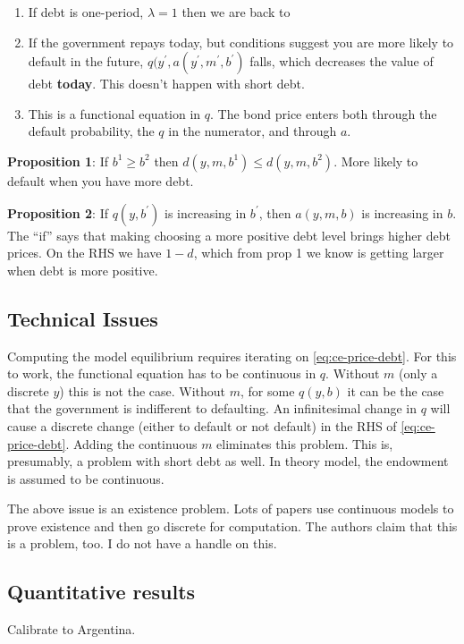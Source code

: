 \documentclass[11pt, pdftex]{article}
\begin{document}
\begin{enumerate}
  \item If debt is one-period, $\lambda=1$ then we are back to \citet{A08}
  \item If the government repays today, but conditions suggest you are more likely to default in the future, $q(y^\prime,a(y^\prime,m^\prime,b^\prime)$ falls, which  decreases the value of debt \textbf{today}. This doesn't happen with short debt.
  \item This is a functional equation in $q$. The bond price enters both through the default probability, the $q$ in the numerator, and through $a$.
\end{enumerate}

\textbf{Proposition 1}: If $b^1 \geq b^2$ then $d(y,m,b^1) \leq d(y,m,b^2)$. More likely to default when you have more debt.

\textbf{Proposition 2}: If $q(y,b^\prime)$ is increasing in $b^\prime$, then $a(y,m,b)$ is increasing in $b$. The ``if'' says that making choosing a more positive debt level brings higher debt prices. On the RHS we have $1-d$, which from prop 1 we know is getting larger when debt is more positive.

\subsection{Technical Issues}
Computing the model equilibrium requires iterating on \eqref{eq:ce-price-debt}. For this to work, the functional equation has to be continuous in $q$. Without $m$ (only a discrete $y$) this is not the case. Without $m$, for some $q(y,b)$ it can be the case that the government is indifferent to defaulting. An infinitesimal change in $q$ will cause a discrete change (either to default or not default) in the RHS of \eqref{eq:ce-price-debt}.  Adding the continuous $m$ eliminates this problem.  This is, presumably, a problem with short debt as well. In \citet{A08} theory model, the endowment is assumed to be continuous.

The above issue is an existence problem. Lots of papers use continuous models to prove existence and then go discrete for computation. The authors claim that this is a problem, too. I do not have a handle on this.

\subsection{Quantitative results}
Calibrate to Argentina.
\end{document}
